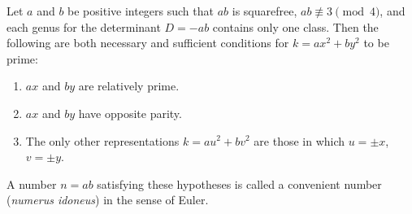Let $a$ and $b$ be positive integers such that $ab$ is squarefree, $ab \not\equiv 3 \pmod{4}$, and each genus for the determinant $D = -ab$ contains only one class. Then the following are both necessary and sufficient conditions for $k = ax^2 + by^2$ to be prime:

\begin{enumerate}
\item $ax$ and $by$ are relatively prime.
\item $ax$ and $by$ have opposite parity.
\item The only other representations $k = au^2 + bv^2$ are those in which $u = \pm x$, $v = \pm y$.
\end{enumerate}

A number $n = ab$ satisfying these hypotheses is called a convenient number (\textit{numerus idoneus}) in the sense of Euler.
